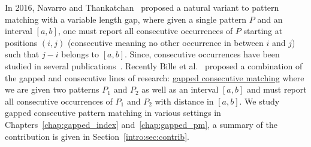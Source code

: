 In 2016, Navarro and Thankatchan~\cite{NAVARRO2016108} proposed a natural variant to pattern matching with a variable length gap, where given a single pattern $P$ and an interval $[a,b]$, one must report all consecutive occurrences of $P$ starting at positions $(i,j)$ (consecutive meaning no other occurrence in between $i$ and $j$) such that $j-i$ belongs to $[a,b]$. Since, consecutive occurrences have been studied in several publications~\cite{DBLP:conf/fsttcs/BilleGPRS20,DBLP:journals/corr/abs-2304-00887,DBLP:journals/corr/abs-2211-16860}.
Recently Bille et al.~\cite{bille2022gapped} proposed a combination of the gapped and consecutive lines of research: \underline{gapped consecutive matching} where we are given two patterns $P_1$ and $P_2$ as well as an interval $[a,b]$ and must report all consecutive occurrences of $P_1$ and $P_2$ with distance in $[a,b]$.
We study gapped consecutive pattern matching in various settings in Chapters~\ref{chap:gapped_index} and~\ref{chap:gapped_pm}, a summary of the contribution is given in Section~\ref{intro:sec:contrib}.

